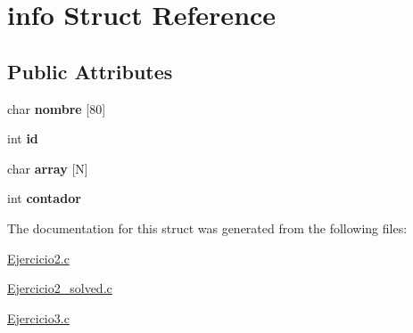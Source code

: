 \hypertarget{structinfo}{}\section{info Struct Reference}
\label{structinfo}
\subsection*{Public Attributes}
\begin{DoxyCompactItemize}
\item 
char {\bfseries nombre} \mbox{[}80\mbox{]}\hypertarget{structinfo_a0de2dc94039ebaa93065006cf9cbb172}{}\label{structinfo_a0de2dc94039ebaa93065006cf9cbb172}

\item 
int {\bfseries id}\hypertarget{structinfo_afe86f23d8bd5fd8d139e39a5b1a01171}{}\label{structinfo_afe86f23d8bd5fd8d139e39a5b1a01171}

\item 
char {\bfseries array} \mbox{[}N\mbox{]}\hypertarget{structinfo_a0a0a04bfaa64287b11d085e6f859a4ad}{}\label{structinfo_a0a0a04bfaa64287b11d085e6f859a4ad}

\item 
int {\bfseries contador}\hypertarget{structinfo_afb848f971a0f63b924dc83681e8930c5}{}\label{structinfo_afb848f971a0f63b924dc83681e8930c5}

\end{DoxyCompactItemize}


The documentation for this struct was generated from the following files\+:\begin{DoxyCompactItemize}
\item 
\hyperlink{Ejercicio2_8c}{Ejercicio2.\+c}\item 
\hyperlink{Ejercicio2__solved_8c}{Ejercicio2\+\_\+solved.\+c}\item 
\hyperlink{Ejercicio3_8c}{Ejercicio3.\+c}\end{DoxyCompactItemize}
